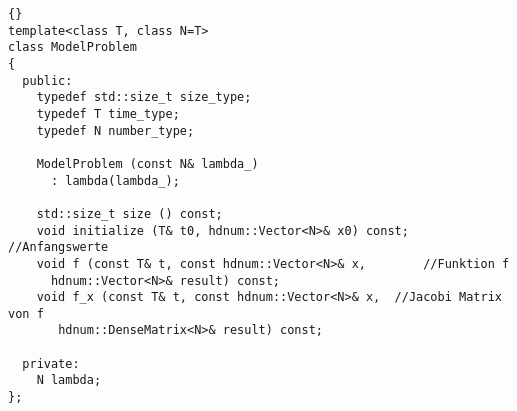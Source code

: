\documentclass[a4paper,11pt]{article}
\theoremstyle{definition}
\begin{document}
{\footnotesize{\begin{lstlisting}{}
template<class T, class N=T>
class ModelProblem
{
  public:
    typedef std::size_t size_type;
    typedef T time_type;
    typedef N number_type;

    ModelProblem (const N& lambda_)
      : lambda(lambda_);

    std::size_t size () const;
    void initialize (T& t0, hdnum::Vector<N>& x0) const;  //Anfangswerte
    void f (const T& t, const hdnum::Vector<N>& x,        //Funktion f
      hdnum::Vector<N>& result) const;
    void f_x (const T& t, const hdnum::Vector<N>& x,  //Jacobi Matrix von f
       hdnum::DenseMatrix<N>& result) const;

  private:
    N lambda;
};
\end{lstlisting}}}
\end{document}
